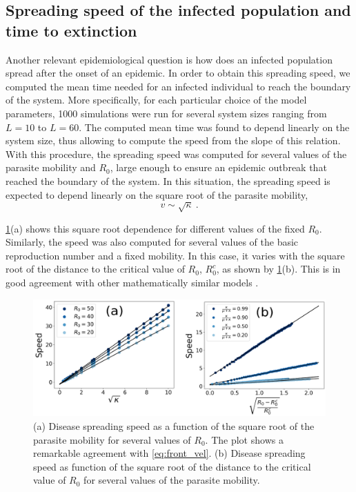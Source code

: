 \subsection{Spreading speed of the infected population and time to extinction}

Another relevant epidemiological question is how does an infected
population spread after the onset of an epidemic. In order to obtain this
spreading speed, we computed the mean time needed for an infected individual to
reach the boundary of the system. More specifically, for each particular choice
of the model parameters, 1000 simulations were run for several system sizes
ranging from $L=10$ to $L=60$. The computed mean time was found to depend
linearly on the system size, thus allowing to compute the speed from the
slope of this relation. With this procedure, the spreading speed was computed
for several values of the parasite mobility and $R_0$, large enough to ensure
an epidemic outbreak that reached the boundary of the system. In this
situation, the spreading speed is expected to depend linearly on the square
root of the parasite mobility,
\begin{equation}\label{eq:front_vel}
    v\sim\sqrt{\kappa} \ .
\end{equation}

\cref{fig:front_velocity}(a) shows this square root dependence for
different values of the fixed $R_0$. Similarly, the speed was also computed for
several values of the basic reproduction number and a fixed mobility. In this
case, it varies with the square root of the distance to the critical value of
$R_0$, $R_0^c$, as shown by \cref{fig:front_velocity}(b). This is in good
agreement with other mathematically similar models \cite{Bertuzzo2010}.

\begin{figure}[H]
    \centering
    \includegraphics[width=1\textwidth]{Figures/Front_velocity.png}
    \caption[Analysis of the spreading speed of the infected population]{(a)
        Disease spreading speed as a function of the square root of the
        parasite
        mobility for several values of $R_0$. The plot shows a remarkable
        agreement with \cref{eq:front_vel}. (b) Disease spreading speed as
        function of the square root of the distance to the critical value of
        $R_0$ for several values of the parasite mobility.}
    \label{fig:front_velocity}
\end{figure}

